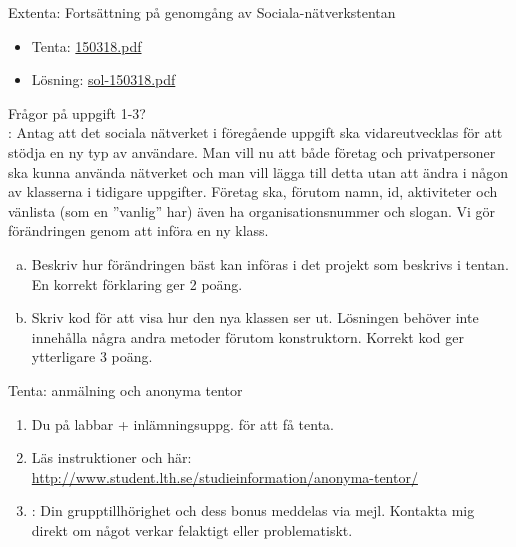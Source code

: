 \documentclass{lecturenotes}
\begin{document}
\begin{Slide}{Extenta: Fortsättning på genomgång av Sociala-nätverkstentan}
\begin{itemize}
\item Tenta: \href{http://fileadmin.cs.lth.se/cs//Education/grundkurs/extentor/150318.pdf}{150318.pdf}
\item Lösning: \href{http://fileadmin.cs.lth.se/cs//Education/grundkurs/extentor/sol-150318.pdf}{sol-150318.pdf}
\end{itemize}
Frågor på uppgift 1-3? \newline \\ \pause
\scriptsize {}:  
Antag att det sociala nätverket i föregående uppgift ska vidareutvecklas för att stödja en ny typ av användare. Man vill nu att både företag och privatpersoner ska kunna använda nätverket och man vill lägga till detta utan att ändra i någon av klasserna i tidigare uppgifter. Företag ska, förutom namn, id, aktiviteter och vänlista (som en ''vanlig''  har) även ha organisationsnummer och slogan. Vi gör förändringen genom att införa en ny klass.
\\
\begin{enumerate}[a.] %
\item Beskriv hur förändringen bäst kan införas i det projekt som beskrivs i tentan. En korrekt förklaring ger 2 poäng.
\item Skriv kod för att visa hur den nya klassen ser ut. Lösningen behöver inte innehålla några andra metoder förutom konstruktorn. Korrekt kod ger ytterligare 3 poäng.
\end{enumerate}

\end{Slide}

\begin{Slide}{Tenta: anmälning och anonyma tentor}
\begin{enumerate}
\item Du  på  labbar + inlämningsuppg. för att få tenta.
\item Läs  instruktioner  och  här: \\ \url{http://www.student.lth.se/studieinformation/anonyma-tentor/}
\item {}: Din grupptillhörighet och dess bonus meddelas via mejl. Kontakta mig direkt om något verkar felaktigt eller problematiskt. 
\end{enumerate}
\end{Slide}
\end{document}
